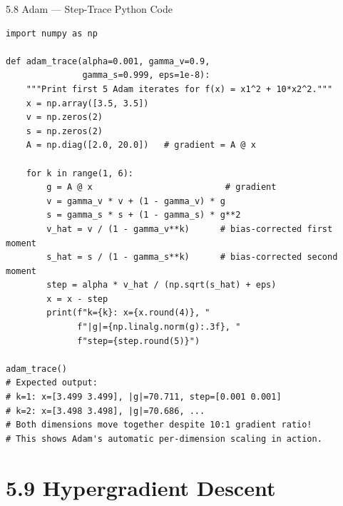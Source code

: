 \documentclass[aspectratio=169,10pt]{beamer}
\begin{document}
\begin{frame}[fragile]{5.8 Adam --- Step-Trace Python Code}
\begin{lstlisting}[caption={Adam Step-by-Step Trace (Python/NumPy)}]
import numpy as np

def adam_trace(alpha=0.001, gamma_v=0.9,
               gamma_s=0.999, eps=1e-8):
    """Print first 5 Adam iterates for f(x) = x1^2 + 10*x2^2."""
    x = np.array([3.5, 3.5])
    v = np.zeros(2)
    s = np.zeros(2)
    A = np.diag([2.0, 20.0])   # gradient = A @ x

    for k in range(1, 6):
        g = A @ x                          # gradient
        v = gamma_v * v + (1 - gamma_v) * g
        s = gamma_s * s + (1 - gamma_s) * g**2
        v_hat = v / (1 - gamma_v**k)      # bias-corrected first moment
        s_hat = s / (1 - gamma_s**k)      # bias-corrected second moment
        step = alpha * v_hat / (np.sqrt(s_hat) + eps)
        x = x - step
        print(f"k={k}: x={x.round(4)}, "
              f"|g|={np.linalg.norm(g):.3f}, "
              f"step={step.round(5)}")

adam_trace()
# Expected output:
# k=1: x=[3.499 3.499], |g|=70.711, step=[0.001 0.001]
# k=2: x=[3.498 3.498], |g|=70.686, ...
# Both dimensions move together despite 10:1 gradient ratio!
# This shows Adam's automatic per-dimension scaling in action.
\end{lstlisting}
\end{frame}

\section{5.9 Hypergradient Descent}
\end{document}
